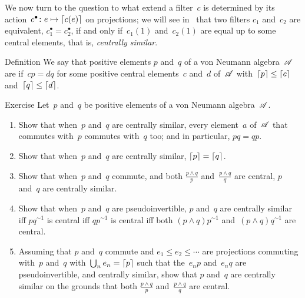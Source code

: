 \documentclass[a]{subfiles}
\begin{document}
\begin{parsec}%
\begin{point}%
We now turn to the question
to what extend a filter~$c$ is determined by
its action~$c^\bullet\colon e\mapsto \left\lceil c(e)\right\rceil$ on projections;
we will see in~\TODO{}
that two filters $c_1$ and~$c_2$
are equivalent, $c_1^\bullet = c_2^\bullet$,
if and only if~$c_1(1)$ and~$c_2(1)$
are equal up to some central elements,
that is, \emph{centrally similar}.
\end{point}
\begin{point}{Definition}%
We say that positive elements $p$ and~$q$ of a von Neumann algebra~$\mathscr{A}$
are 
if~$cp=dq$ for some positive central elements~$c$ and~$d$ of~$\mathscr{A}$
with~$\left\lceil p\right\rceil\leq \left\lceil c\right\rceil$
and~$\left\lceil q\right\rceil\leq \left\lceil d\right\rceil$.
\end{point}
\begin{point}{Exercise}%
Let~$p$ and~$q$ be positive elements
of a von Neumann algebra~$\mathscr{A}$.
\begin{enumerate}
\item
Show that when~$p$ and~$q$ are centrally similar,
every element~$a$ of~$\mathscr{A}$ that commutes
with~$p$ commutes with~$q$ too;
and in particular, $pq=qp$.
\item
Show that when~$p$ and~$q$ are centrally similar,
$\left\lceil p\right\rceil=\left\lceil q\right\rceil$.
\item
Show that when~$p$ and~$q$ commute,
and both $\frac{p\wedge q}{p}$ 
and~$\frac{p\wedge q}{q}$
are central,
$p$ and~$q$ are centrally similar.
\item
Show that when~$p$ and~$q$ are pseudoinvertible,
$p$ and~$q$ are centrally similar iff
$pq^{\sim 1}$ is central
iff $qp^{\sim 1}$ is central
iff both $(p\wedge q)p^{\sim 1}$
and~$(p\wedge q)q^{\sim 1}$ are central.
\item
Assuming that $p$ and~$q$ commute
and $e_1 \leq e_2 \leq \dotsb$
are projections commuting with~$p$ and~$q$
with~$\bigcup_n e_n=\left\lceil p\right\rceil$
such that the~$e_np$ and~$e_nq$
are pseudoinvertible,
and centrally similar,
show that $p$ and~$q$ are centrally similar
on the 
grounds that both  $\frac{p\wedge q}{p}$
and~$\frac{p\wedge q}{q}$ are central.


\end{enumerate}
\end{point}
\end{parsec}
\end{document}
